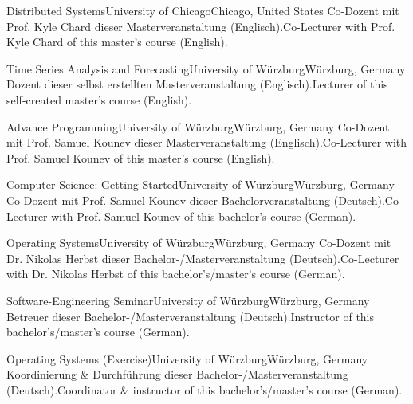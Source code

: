
\begin{cventries}

    {Distributed Systems}{University of Chicago}{Chicago, United States}%
    {} %
    {Co-Dozent mit Prof. Kyle Chard dieser Masterveranstaltung (Englisch).}{Co-Lecturer with Prof. Kyle Chard of this master's course (English).}

    {Time Series Analysis and Forecasting}{University of Würzburg}{Würzburg, Germany}%
    {} %
    {Dozent dieser selbst erstellten Masterveranstaltung (Englisch).}{Lecturer of this self-created master's course (English).}

    {Advance Programming}{University of Würzburg}{Würzburg, Germany}%
    {} %
    {Co-Dozent mit Prof. Samuel Kounev dieser Masterveranstaltung (Englisch).}{Co-Lecturer with Prof. Samuel Kounev of this master's course (English).}

    {Computer Science: Getting Started}{University of Würzburg}{Würzburg, Germany}%
    {} %
    {Co-Dozent mit Prof. Samuel Kounev dieser Bachelorveranstaltung (Deutsch).}{Co-Lecturer with Prof. Samuel Kounev of this bachelor's course (German).}

    {Operating Systems}{University of Würzburg}{Würzburg, Germany}%
    {} %
    {Co-Dozent mit Dr. Nikolas Herbst dieser Bachelor-/Masterveranstaltung (Deutsch).}{Co-Lecturer with Dr. Nikolas Herbst of this bachelor's/master's course (German).}

    {Software-Engineering Seminar}{University of Würzburg}{Würzburg, Germany}%
    {} %
    {Betreuer dieser Bachelor-/Masterveranstaltung (Deutsch).}{Instructor of this bachelor's/master's course (German).}

    {Operating Systems (Exercise)}{University of Würzburg}{Würzburg, Germany}%
    {} %
    {Koordinierung \& Durchführung dieser Bachelor-/Masterveranstaltung (Deutsch).}{Coordinator \& instructor of this bachelor's/master's course (German).}


\end{cventries}
